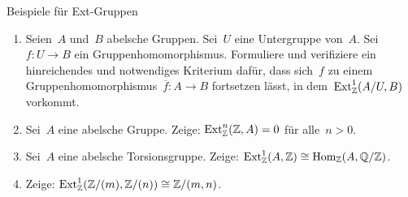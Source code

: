 \documentclass{uebblatt}
\begin{document}

\begin{aufgabe}{Beispiele für Ext-Gruppen}
\begin{enumerate}
\item Seien~$A$ und~$B$ abelsche Gruppen. Sei~$U$ eine Untergruppe
von~$A$. Sei~$f : U \to B$ ein Gruppenhomomorphismus. Formuliere und
verifiziere ein hinreichendes und notwendiges Kriterium dafür, dass sich~$f$ zu
einem Gruppenhomomorphismus~$\overline{f} : A \to B$ fortsetzen lässt, in
dem~$\mathrm{Ext}^1_{\mathbb{Z}}(A/U,B)$ vorkommt.
\item Sei~$A$ eine abelsche Gruppe. Zeige: $\mathrm{Ext}^n_{\mathbb{Z}}(\mathbb{Z}, A) = 0$ für alle~$n > 0$.
\item Sei~$A$ eine abelsche Torsionsgruppe. Zeige: $\mathrm{Ext}^1_{\mathbb{Z}}(A,\mathbb{Z}) \cong
\mathrm{Hom}_{\mathbb{Z}}(A, \mathbb{Q}/\mathbb{Z})$.
\item Zeige: $\mathrm{Ext}^1_{\mathbb{Z}}(\mathbb{Z}/(m), \mathbb{Z}/(n)) \cong \mathbb{Z}/(m,n)$.
\end{enumerate}
\end{aufgabe}
\end{document}
